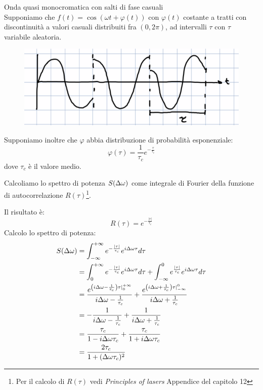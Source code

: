 \begin{example}Onda quasi monocromatica con salti di fase casuali\\
Supponiamo che $f(t) = \cos(\omega t +\varphi(t))$ con $\varphi(t)$ costante a tratti con discontinuità a valori casuali distribuiti fra $(0,2\pi)$, ad intervalli $\tau$ con $\tau$ variabile aleatoria. 
\begin{figure}
    \centering
    \includegraphics[width=0.9\linewidth]{phase_jumps}
\end{figure}
Supponiamo inoltre che $\varphi$ abbia distribuzione di probabilità esponenziale:
\begin{equation*}
    \varphi(\tau) = \frac{1}{\tau_c} e^{-\frac{\tau}{\tau_c}}
\end{equation*}
dove $\tau_c$ è il valore medio.

Calcoliamo lo spettro di potenza $S(\Delta \omega)$ come integrale di Fourier della funzione di autocorrelazione $R(\tau)$\footnote{Per il calcolo di $R(\tau)$ vedi \textit{Principles of lasers} Appendice del capitolo 12}.

Il risultato è:
\begin{equation*}
R(\tau) = e^{-\frac{|\tau|}{\tau_c}}
\end{equation*}
Calcolo lo spettro di potenza:
\begin{align*}
    S(\Delta \omega) &= \int_{-\infty}^{+\infty} e^{-\frac{|\tau|}{\tau_c}} e^{i\Delta\omega\tau} d\tau\\
    &= \int_0^{+\infty} e^{-\frac{|\tau|}{\tau_c}} e^{i\Delta\omega\tau} d\tau + \int_{-\infty}^0 e^{\frac{|\tau|}{\tau_c}} e^{i\Delta\omega\tau} d\tau\\
    &= \frac{e^{\left(i\Delta\omega - \frac{1}{\tau_c}\right)\tau|_0^{+\infty}}}{i\Delta\omega - \frac{1}{\tau_c}} + \frac{e^{\left(i\Delta\omega + \frac{1}{\tau_c}\right)\tau|_{-\infty}^0}}{i\Delta\omega + \frac{1}{\tau_c}}\\
    &= -\frac{1}{i\Delta\omega - \frac{1}{\tau_c}} + \frac{1}{i\Delta\omega + \frac{1}{\tau_c}}\\
    &= \frac{\tau_c}{1 - i\Delta\omega\tau_c} + \frac{\tau_c}{1 + i\Delta\omega\tau_c}\\
    &= \frac{2\tau_c}{1 + (\Delta\omega\tau_c)^2}
\end{align*}


\end{example}
